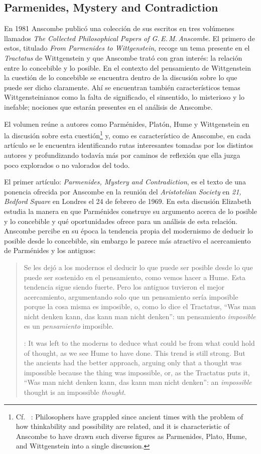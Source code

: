 \subsection{Parmenides, Mystery and Contradiction}

En 1981 Anscombe publicó una colección de sus escritos en tres volúmenes llamados \emph{The Collected Philosophical Papers of G.\,E.\,M.\,Anscombe}. El primero de estos, titulado \emph{From Parmenides to Wittgenstein}, recoge un tema presente en el \emph{Tractatus} de Wittgenstein y que Anscombe trató con gran interés: la relación entre lo concebible y lo posible. En el contexto del pensamiento de Wittgenstein la cuestión de lo concebible se encuentra dentro de la discusión sobre lo que puede ser dicho claramente. Ahí se encuentran también característicos temas Wittgensteinianos como la falta de significado, el sinsentido, lo misterioso y lo inefable; nociones que estarán presentes en el análisis de Anscombe.

El volumen reúne a autores como Parménides, Platón, Hume y Wittgenstein en la discusión sobre esta cuestión\footnote{Cf.~ \cite[193]{teichmann2008ans}: Philosophers have grappled since ancient times with the problem of how thinkability and possibility are related, and it is characteristic of Anscombe to have drawn such diverse figures as Parmenides, Plato, Hume, and Wittgenstein into a single discussion.} y, como es característico de Anscombe, en cada artículo se le encuentra identificando rutas interesantes tomadas por los distintos autores y profundizando todavía más por caminos de reflexión que ella juzga poco explorados o no valorados del todo.

El primer artículo: \emph{Parmenides, Mystery and Contradiction}, es el texto de una ponencia ofrecida por Anscombe en la reunión del \emph{Aristotelian Society} en \emph{21, Bedford Square} en Londres el 24 de febrero de 1969. En esta discusión Elizabeth estudia la manera en que Parménides construye su argumento acerca de lo posible y lo concebible y qué oportunidades ofrece para un análisis de esta relación. Anscombe percibe en su época la tendencia propia del modernismo de deducir lo posible desde lo concebible, sin embargo le parece más atractivo el acercamiento de Parménides y los antiguos: \blockquote[{\cite[xi]{anscombe1981parmenides}}: It was left to the moderns to deduce what could be from what could hold of thought, as we see Hume to have done. This trend is still strong. But the ancients had the better approach, arguing only that a thought was impossible because the thing was impossible, or, as the Tractatus puts it, ``Was man nicht denken kann, das kann man nicht denken'': an \emph{impossible} thought is an impossible \emph{thought}.]{Se les dejó a los modernos el deducir lo que puede ser posible desde lo que puede ser sostenido en el pensamiento, como vemos hacer a Hume. Esta tendencia sigue siendo fuerte. Pero los antiguos tuvieron el mejor acercamiento, argumentando solo que un pensamiento sería imposible porque la cosa misma es imposible, o, como lo dice el Tractatus, ``Was man nicht denken kann, das kann man nicht denken'': un pensamiento \emph{imposible} es un \emph{pensamiento} imposible.}

